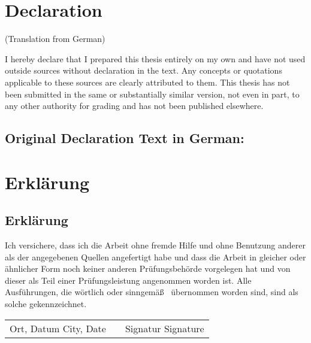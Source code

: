 
\ifgerman\else
\chapter*{Declaration}\vspace{-24pt}

(Translation from German)\bigskip

\noindent I hereby declare that I prepared this thesis entirely on my own and have not used outside sources
without declaration in the text. Any concepts or quotations applicable to these sources are
clearly attributed to them. This thesis has not been submitted in the same or substantially similar
version, not even in part, to any other authority for grading and has not been published elsewhere.

\section*{Original Declaration Text in German:}

\fi
\ifgerman
\chapter*{Erklärung}
\else
\section*{Erklärung}
\fi

Ich versichere, dass ich die Arbeit ohne fremde Hilfe und ohne Benutzung anderer als der
angegebenen Quellen angefertigt habe und dass die Arbeit in gleicher oder ähnlicher Form
noch keiner anderen Prüfungsbehörde vorgelegen hat und von dieser als Teil einer
Prüfungsleistung angenommen worden ist. Alle Ausführungen, die wörtlich oder sinngemäß~
übernommen worden sind, sind als solche ge\-kenn\-zeich\-net.

\vspace{40pt}

\begin{center}
	\begin{tabular}{l p{} r}
		\cline{1-1} \cline{3-3}
		\begin{minipage}[t]{0.4\textwidth}
			\centering
			\ifgerman
			Ort, Datum
			\else
			City, Date
			\fi
		\end{minipage}
		&
		\begin{minipage}[t]{0.2\textwidth}
		\end{minipage}
		&
		\begin{minipage}[t]{0.4\textwidth}
			\centering
			\ifgerman
			Signatur
			\else
			Signature
			\fi
		\end{minipage}
	\end{tabular}
\end{center}